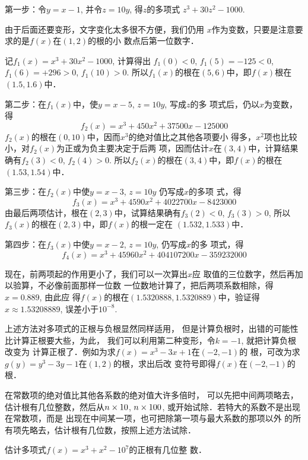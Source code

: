 \begin{solution}
第一步：令$y=x-1$, 并令$z=10y$, 得$z$的多项式
$z^3+30z^2-1000$.

由于后面还要变形，文字变化太多很不方便，我们仍用
$x$作为变数，只要是注意要求的是$f(x)$在$(1,2)$的根的小
数点后第一位数字．

记$f_1(x)=x^3+30x^2-1000$, 计算得出
$f_1(0)<0$, $f_1(5)=-125<0$, $f_1(6)=+296>0$, $f_1(10)>0$.
所以$f_1(x)$的根在$(5,6)$中，即$f(x)$根在$(1.5,1.6)$中．

第二步：在$f_1(x)$中，使$y=x-5$, $z=10y$, 写成$z$的多
项式后，仍以$x$为变数，得
\[f_2(x)=x^3+450x^2+37500x-125000\]
$f_2(x)$的根在$(0,10)$中，因而$x^3$的绝对值比之其他各项要小
得多，$x^2$项也比较小，对$f_2(x)$为正或为负主要决定于后两
项，因而估计$x$在$(3,4)$中，计算结果确有$f_2(3)<0$, 
$f_2(4)>0$. 所以$f_2(x)$的根在$(3,4)$中，即$f(x)$的根在
$(1.53,1.54)$中．

第三步：在$f_2(x)$中使$y=x-3$, $z=10y$ 仍写成$x$的多项
式，得
\[f_3(x)=x^3+4590x^2+4022700x-8423000\]
由最后两项估计，根在$(2,3)$中，试算结果确有$f_3(2)<0$, 
$f_3(3)>0$, 所以$f_3(x)$的根在$(2,3)$中，即$f(x)$的根一定在
$(1.532,1.533)$中．

第四步：在$f_3(x)$中使$y=x-2$, $z=10y$, 仍写成$x$的多
项式，得
\[f_4(x)=x^3+45960x^2+404107200x-359232000\]

现在，前两项起的作用更小了，我们可以一次算出$x$应
取值的三位数字，然后再加以验算，不必像前面那样一位数
一位数地计算了，把后两项系数相除，得$x=0.889$, 由此应
得$f(x)$的根在$(1.5320888,1.5320889)$中，验证得$x\approx 1.53208889$,
误差小于$10^{-8}$.
\end{solution}

\begin{rmk}
    上述方法对多项式的正根与负根显然同样适用，
但是计算负根时，出错的可能性比计算正根要大些，为此，
我们可以利用第二种变形，令$k=-1$, 就把计算负根改变为
计算正根了．例如为求$f(x)=x^3-3x+1$在$(-2,-1)$的
根，可改为求$g(y)=y^3-3y-1$在$(1,2)$的根，求出后改
变符号即得$f(x)$在$(-2,-1)$的根．

在常数项的绝对值比其他各系数的绝对值大许多倍时，
可以先把中间两项略去，估计根有几位整数，然后从$n\times10$,
$n\times100$, 或开始试除．若特大的系数不是出现在常数项，而是
出现在中间某一项，也可把除第一项与最大系数的那项以外
的所有项先略去，估计根有几位数，按照上述方法试除．
\end{rmk}

\begin{example}
    估计多项式$f(x)=x^3+x^2-10^7$的正根有几位整
数．
\end{example}

